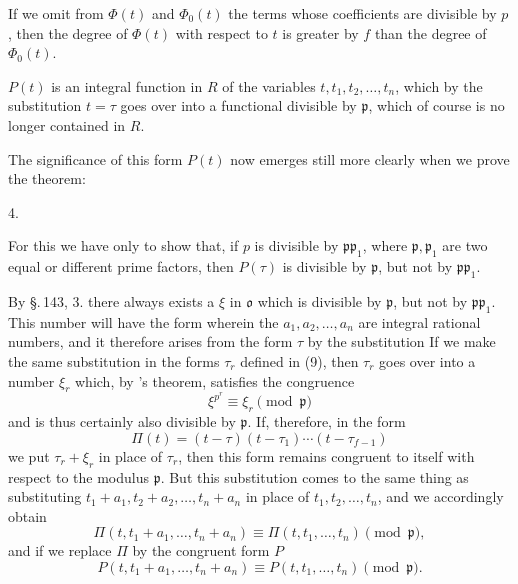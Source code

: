 If we omit from $\Phi(t)$ and $\Phi_0(t)$ the terms whose coefficients are divisible by $p$, then the degree of $\Phi(t)$ with respect to $t$ is greater by $f$ than the degree of $\Phi_0(t)$.

$P(t)$ is an integral function in $R$ of the variables $t, t_1, t_2, \ldots, t_n$, which by the substitution $t=\tau$ goes over into a functional divisible by $\mathfrak p$, which of course is no longer contained in $R$.

The significance of this form $P(t)$ now emerges still more clearly when we prove the theorem:

4. 

For this we have only to show that, if $p$ is divisible by $\mathfrak p \mathfrak p_1$, where $\mathfrak p, \mathfrak p_1$ are two equal or different prime factors, then $P(\tau)$ is divisible by $\mathfrak p$, but not by $\mathfrak p \mathfrak p_1$.

By \S.\,143, 3. there always exists a  $\xi$ in $\mathfrak{o}$ which is divisible by $\mathfrak p$, but not by $\mathfrak p \mathfrak p_1$. This number will have the form
wherein the $a_1, a_2, \ldots, a_n$ are integral rational numbers, and it therefore arises from the form $\tau$ by the substitution
If we make the same substitution in the forms $\tau_r$ defined in (9), then $\tau_r$ goes over into a number $\xi_r$ which, by 's theorem, satisfies the congruence
\[ \xi^{p^r} \equiv \xi_r \pmod{\mathfrak p} \]
and is thus certainly also divisible by $\mathfrak p$. If, therefore, in the form
\[ \Pi(t) = (t-\tau)(t-\tau_1) \cdots (t - \tau_{f-1}) \]
we put $\tau_r + \xi_r$ in place of $\tau_r$, then this form remains congruent to itself with respect to the modulus $\mathfrak p$. But this substitution comes to the same thing as substituting $t_1+a_1, t_2+a_2, \ldots, t_n+a_n$ in place of $t_1, t_2, \ldots, t_n$, and we accordingly obtain
\[ \Pi(t, t_1+a_1, \ldots, t_n+a_n) \equiv \Pi(t, t_1, \ldots, t_n) \pmod{\mathfrak p}, \]
and if we replace $\Pi$ by the congruent form $P$
\[ P(t, t_1+a_1, \ldots, t_n+a_n) \equiv P(t, t_1, \ldots, t_n) \pmod{\mathfrak p}. \]
